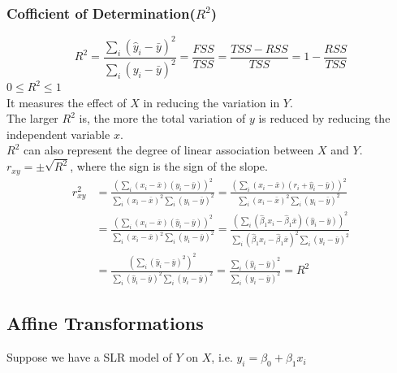 \documentclass[11pt,a4paper]{article}
\begin{document}
\subsubsection{Cofficient of Determination($R^2$)}
$$R^{2}=\frac{\sum_{i}\left(\hat{y}_{i}-\bar{y}\right)^{2}}{\sum_{i}\left(y_{i}-\bar{y}\right)^{2}}=\frac{F S S}{T S S}=\frac{T S S-R S S}{T S S}=1-\frac{R S S}{T S S}$$
$0\leq R^2\leq 1$\\
It measures the effect of $X$ in reducing the variation in $Y$.\\
The larger $R^2$ is, the more the total variation of $y$ is reduced by reducing the independent variable $x$.\\

$R^2$ can also represent the degree of linear association between $X$ and $Y$.\\
$r_{xy}= \pm \sqrt{R^2}$, where the sign is the sign of the slope.
\begin{equation}
    \begin{aligned}
       r_{xy}^2
       &=\frac{(\sum_{i}\left(x_{i}-\bar{x}\right)\left(y_{i}-\bar{y}\right))^2}{\sum_{i}\left(x_{i}-\bar{x}\right)^{2}\sum_{i}\left(y_{i}-\bar{y}\right)^{2}}=\frac{(\sum_{i}\left(x_{i}-\bar{x}\right)\left(r_i+\hat{y}_{i}-\bar{y}\right))^2}{\sum_{i}\left(x_{i}-\bar{x}\right)^{2}\sum_{i}\left(y_{i}-\bar{y}\right)^{2}}\\
       &=\frac{(\sum_{i}\left(x_{i}-\bar{x}\right)\left(\hat{y}_{i}-\bar{y}\right))^2}{\sum_{i}\left(x_{i}-\bar{x}\right)^{2}\sum_{i}\left(y_{i}-\bar{y}\right)^{2}}=\frac{(\sum_{i}\left(\hat{\beta}_1 x_{i}-\hat{\beta}_1 \bar{x}\right)\left(\hat{y}_{i}-\bar{y}\right))^2}{\sum_{i}\left(\hat{\beta}_1 x_{i}-\hat{\beta}_1 \bar{x}\right)^{2}\sum_{i}\left(y_{i}-\bar{y}\right)^{2}}\\
       &=\frac{(\sum_{i}\left(\hat{y}_{i}-\bar{y}\right)^2)^2}{\sum_{i}\left(\hat{y}_{i}-\bar{y}\right)^{2}\sum_{i}\left(y_{i}-\bar{y}\right)^{2}}=\frac{\sum_{i}\left(\hat{y}_{i}-\bar{y}\right)^{2}}{\sum_{i}\left(y_{i}-\bar{y}\right)^{2}}=R^2
    \end{aligned}
    \nonumber
\end{equation}

\subsection{Affine Transformations}
Suppose we have a SLR model of $Y$ on $X$, i.e. $y_i=\beta_0+\beta_1x_i$\\
\end{document}
